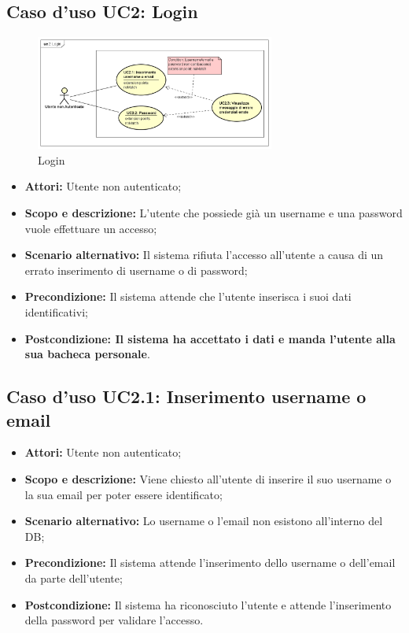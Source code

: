 \documentclass[12pt,a4paper,titlepage]{article}
\begin{document}
	\subsection{Caso d'uso UC2: Login}
	\label{UC2}
	\begin{figure}[H]
		\centering
		\includegraphics[width=0.7\textwidth]{UseCase/Login}
		\caption{Login}
	\end{figure}
	\begin{itemize}
		\item \textbf{Attori:} Utente non autenticato;
		\item \textbf{Scopo e descrizione:} L'utente che possiede già un username e una password vuole effettuare un accesso;
		\item \textbf{Scenario alternativo: }Il sistema rifiuta l'accesso all'utente a causa di un errato inserimento di username o di password;
		\item \textbf{Precondizione: }Il sistema attende che l'utente inserisca i suoi dati identificativi;
		\item \textbf{Postcondizione: Il sistema ha accettato i dati e manda l'utente alla sua bacheca personale}.
	\end{itemize}
	\subsection{Caso d'uso UC2.1: Inserimento username o email}
	\label{UC2.1}
	\begin{itemize}
		\item \textbf{Attori: }Utente non autenticato;
		\item \textbf{Scopo e descrizione: }Viene chiesto all'utente di inserire il suo username o la sua email per poter essere identificato;
		\item \textbf{Scenario alternativo: }Lo username o l'email non esistono all'interno del DB;
		\item \textbf{Precondizione: }Il sistema attende l'inserimento dello username o dell'email da parte dell'utente;
		\item \textbf{Postcondizione: }Il sistema ha riconosciuto l'utente e attende l'inserimento della password per validare l'accesso.
	\end{itemize}
\end{document}
